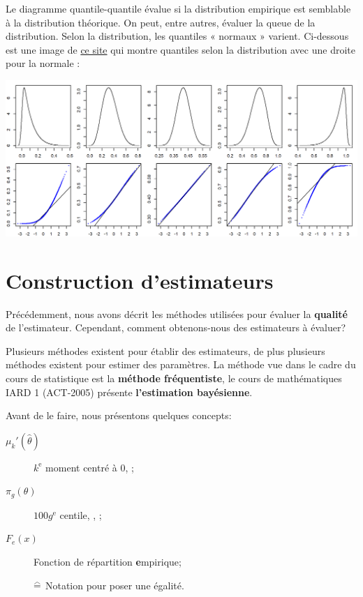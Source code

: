 \documentclass[10pt, french]{article}
\begin{document}
\begin{multicols*}{2}
Le diagramme quantile-quantile évalue si la distribution empirique est semblable à la distribution théorique. On peut, entre autres, évaluer la queue de la distribution. Selon la distribution, les quantiles « normaux » varient. Ci-dessous est une image de \href{https://mgimond.github.io/ES218/Week06a.html}{ce site} qui montre quantiles selon la distribution avec une droite pour la normale :
\begin{center}
	\includegraphics[scale=0.5]{../../src/ACT-2000/qqplot-skeweing.png}
\end{center}


\columnbreak
\section{Construction d'estimateurs}

Précédemment, nous avons décrit les méthodes utilisées pour évaluer la \textbf{qualité} de l'estimateur. 
Cependant, comment obtenons-nous des estimateurs à évaluer?

Plusieurs méthodes existent pour établir des estimateurs, de plus plusieurs méthodes existent pour estimer des paramètres.
La méthode vue dans le cadre du cours de statistique est la \textbf{méthode fréquentiste}, le cours de mathématiques IARD 1 (ACT-2005) présente \textbf{l'estimation bayésienne}.

Avant de le faire, nous présentons quelques concepts:
\begin{distributions}[Terminologie]
\begin{description}
	\item[$\mu_{k}'(\hat{\theta})$]	$k^{\text{e}}$ moment centré à 0, ;
	\item[$\pi_{g}(\theta)$]	$100g^{\text{e}}$ centile, , ;
	\item[$F_{e}(x)$]	Fonction de répartition \textbf{e}mpirique;
	\item[]	$\equalhat$	Notation pour poser une égalité.
\end{description}
\end{distributions}


\end{multicols*}
\end{document}
